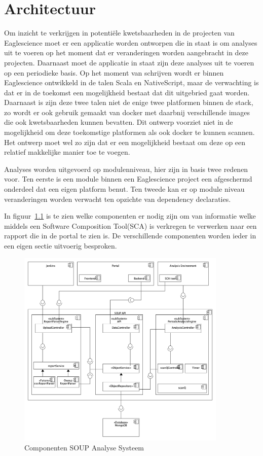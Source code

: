 \chapter{Architectuur}\label{ch:Architectuur}

Om inzicht te verkrijgen in potentiële kwetsbaarheden in de projecten van Eaglescience moet er een applicatie worden ontworpen die in staat is om analyses uit te voeren op het moment dat er veranderingen worden aangebracht in deze projecten. Daarnaast moet de applicatie in staat zijn deze analyses uit te voeren op een periodieke basis.
Op het moment van schrijven wordt er binnen Eaglescience ontwikkeld in de talen Scala en NativeScript, maar de verwachting is dat er in de toekomst een mogelijkheid bestaat dat dit uitgebried gaat worden. Daarnaast is zijn deze twee talen niet de enige twee platformen binnen de stack, zo wordt er ook gebruik gemaakt van docker met daarbnij verschillende images die ook kwetsbaarheden kunnen bevatten. Dit ontwerp voorziet niet in de mogelijkheid om deze toekomstige platformen als ook docker te kunnen scannen. Het ontwerp moet wel zo zijn dat er een mogelijkheid bestaat om deze op een relatief makkelijke manier toe te voegen.

Analyses worden uitgevoerd op modulenniveau, hier zijn in basis twee redenen voor. Ten eerste is een module binnen een Eaglescience project een afgeschermd onderdeel dat een eigen platform benut. Ten tweede kan er op module niveau veranderingen worden verwacht ten opzichte van dependency declaraties.

In figuur~\ref{fig:SOUP-Components} is te zien welke componenten er nodig zijn om van informatie welke middels een Software Composition Tool(SCA) is verkregen te verwerken naar een rapport die in de portal te zien is. De verschillende componenten worden ieder in een eigen sectie uitvoerig besproken.
\begin{figure}[bth]
    \myfloatalign
    \includegraphics[width=10cm]{gfx/umlet/exports/ApplicationComponents}
    \caption{Componenten SOUP Analyse Systeem}
    \label{fig:SOUP-Components}
\end{figure}
